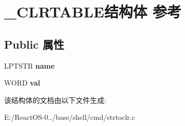 \hypertarget{struct___c_l_r_t_a_b_l_e}{}\section{\+\_\+\+C\+L\+R\+T\+A\+B\+L\+E结构体 参考}
\label{struct___c_l_r_t_a_b_l_e}
\subsection*{Public 属性}
\begin{DoxyCompactItemize}
\item 
\mbox{\label{struct___c_l_r_t_a_b_l_e_a7bcb32671f29adb5d51de657e149ac1b}} 
L\+P\+T\+S\+TR {\bfseries name}
\item 
\mbox{\label{struct___c_l_r_t_a_b_l_e_a881b8ee3688c0bdf247a37ecf1883cc5}} 
W\+O\+RD {\bfseries val}
\end{DoxyCompactItemize}


该结构体的文档由以下文件生成\+:\begin{DoxyCompactItemize}
\item 
E\+:/\+React\+O\+S-\/0../base/shell/cmd/strtoclr.\+c\end{DoxyCompactItemize}
